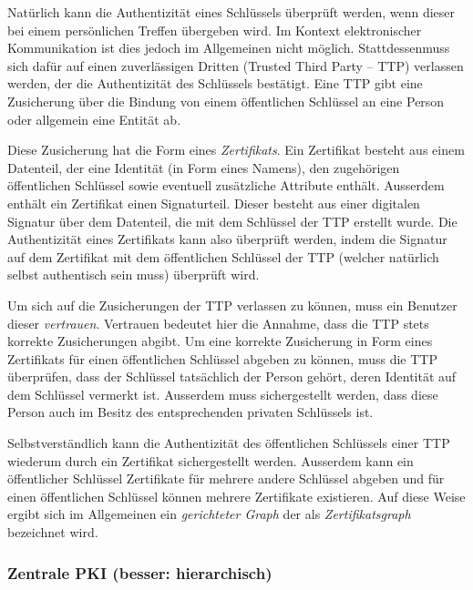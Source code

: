 Nat\"urlich kann die Authentizit\"at eines Schl\"ussels \"uberpr\"uft
werden, wenn dieser bei einem pers\"onlichen Treffen \"ubergeben
wird. Im Kontext elektronischer Kommunikation ist dies jedoch im
Allgemeinen nicht m\"oglich. Stattdessenmuss sich daf\"ur auf einen
zuverl\"assigen Dritten (Trusted Third Party -- TTP) verlassen werden,
der die Authentizit\"at des Schl\"ussels best\"atigt. Eine TTP gibt
eine Zusicherung \"uber die Bindung von einem \"offentlichen
Schl\"ussel an eine Person oder allgemein eine Entit\"at ab.

Diese Zusicherung hat die Form eines \emph{Zertifikats}. Ein
Zertifikat besteht aus einem Datenteil, der eine Identit\"at (in Form
eines Namens), den zugeh\"origen \"offentlichen Schl\"ussel sowie
eventuell zus\"atzliche Attribute enth\"alt. Ausserdem enth\"alt ein
Zertifikat einen Signaturteil. Dieser besteht aus einer digitalen
Signatur \"uber dem Datenteil, die mit dem Schl\"ussel der TTP
erstellt wurde. Die Authentizit\"at eines Zertifikats kann also
\"uberpr\"uft werden, indem die Signatur auf dem Zertifikat mit dem
\"offentlichen Schl\"ussel der TTP (welcher nat\"urlich selbst
authentisch sein muss) \"uberpr\"uft wird.

Um sich auf die Zusicherungen der TTP verlassen zu k\"onnen, muss ein
Benutzer dieser \emph{vertrauen}. Vertrauen bedeutet hier die Annahme,
dass die TTP stets korrekte Zusicherungen abgibt. Um eine korrekte
Zusicherung in Form eines Zertifikats f\"ur einen \"offentlichen
Schl\"ussel abgeben zu k\"onnen, muss die TTP \"uberpr\"ufen, dass der
Schl\"ussel tats\"achlich der Person geh\"ort, deren Identit\"at auf
dem Schl\"ussel vermerkt ist. Ausserdem muss sichergestellt werden,
dass diese Person auch im Besitz des entsprechenden privaten
Schl\"ussels ist.

Selbstverst\"andlich kann die Authentizit\"at des \"offentlichen
Schl\"ussels einer TTP wiederum durch ein Zertifikat sichergestellt
werden. Ausserdem kann ein \"offentlicher Schl\"ussel Zertifikate
f\"ur mehrere andere Schl\"ussel abgeben und f\"ur einen
\"offentlichen Schl\"ussel k\"onnen mehrere Zertifikate
existieren. Auf diese Weise ergibt sich im Allgemeinen ein
\emph{gerichteter Graph} der als \emph{Zertifikatsgraph} bezeichnet
wird.

\subsubsection{Zentrale PKI (besser: hierarchisch)}
\label{ch:Grundlagen:sec:PublicKeyCrypto:subsec:KeyAuth:subsubsec:PKI}

